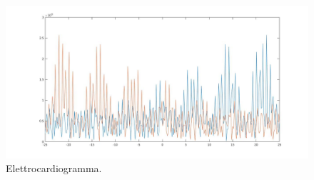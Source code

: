 \documentclass[12pt,oneside,openany]{memoir}
\numberwithin{equation}{subsection}
\begin{document}
\begin{figure}[H]
\centering
\captionsetup{justification=centering}
\includegraphics[width=1.0\textwidth]{images/matlab_ecg_spectrum.jpg}
\caption{Elettrocardiogramma.}
\end{figure}

\newpage
\end{document}
